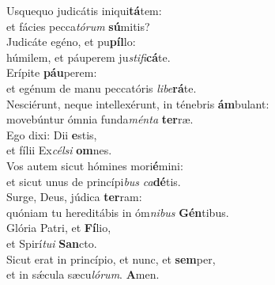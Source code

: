 \evenverse Usquequo judicátis iniqui\textbf{tá}tem:~\*\\
\evenverse et fácies pecca\textit{tó}\textit{rum} \textbf{sú}mitis?\\
\oddverse Judicáte egéno, et pu\textbf{píl}lo:~\*\\
\oddverse húmilem, et páuperem ju\textit{sti}\textit{fi}\textbf{cá}te.\\
\evenverse Erípite \textbf{páu}perem:~\*\\
\evenverse et egénum de manu peccatóris \textit{li}\textit{be}\textbf{rá}te.\\
\oddverse Nesciérunt, neque intellexérunt, in ténebris \textbf{ám}bulant:~\*\\
\oddverse movebúntur ómnia funda\textit{mén}\textit{ta} \textbf{ter}ræ.\\
\evenverse Ego dixi: Dii \textbf{e}stis,~\*\\
\evenverse et fílii Ex\textit{cél}\textit{si} \textbf{om}nes.\\
\oddverse Vos autem sicut hómines mori\textbf{é}mini:~\*\\
\oddverse et sicut unus de princípi\textit{bus} \textit{ca}\textbf{dé}tis.\\
\evenverse Surge, Deus, júdica \textbf{ter}ram:~\*\\
\evenverse quóniam tu hereditábis in óm\textit{ni}\textit{bus} \textbf{Gén}tibus.\\
\oddverse Glória Patri, et \textbf{Fí}lio,~\*\\
\oddverse et Spirí\textit{tu}\textit{i} \textbf{San}cto.\\
\evenverse Sicut erat in princípio, et nunc, et \textbf{sem}per,~\*\\
\evenverse et in sǽcula sæcu\textit{ló}\textit{rum}. \textbf{A}men.\\
